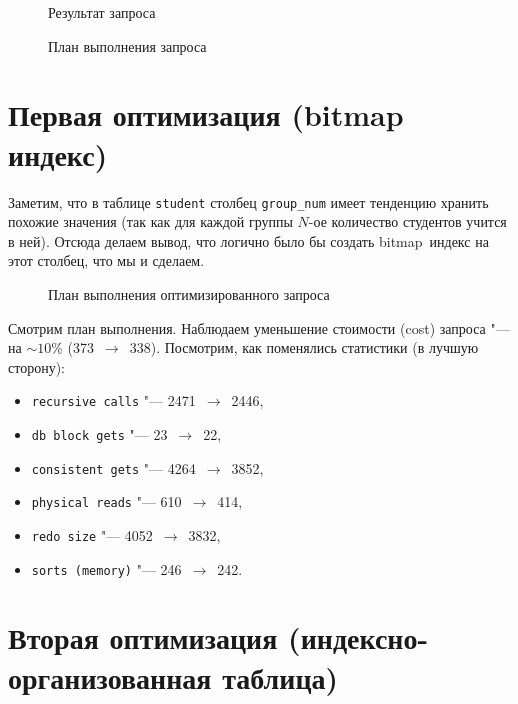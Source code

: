 \begin{figure}[H]%
  \caption{Результат запроса}
  \label{fig-task-3-output}
\end{figure}


\begin{figure}[H]%
  \caption{План выполнения запроса}
  \label{fig-task-3-plan}
\end{figure}


\section{Первая оптимизация (bitmap индекс)}


Заметим, что в таблице \texttt{student} столбец \texttt{group\_num} имеет тенденцию хранить похожие значения (так как для каждой группы $N$-ое количество студентов учится в ней).
Отсюда делаем вывод, что логично было бы создать bitmap~индекс на этот столбец, что мы и сделаем.

\begin{figure}[H]%
  \caption{План выполнения оптимизированного запроса}
  \label{fig-task-3-bitmap-plan}
\end{figure}

Смотрим план выполнения. Наблюдаем уменьшение стоимости (cost) запроса "--- на $\sim 10$\% (373~$\to$~338).
Посмотрим, как поменялись статистики (в лучшую сторону):
\begin{itemize}%
  \item \texttt{recursive calls} "--- 2471~$\to$~2446,
  \item \texttt{db block gets} "--- 23~$\to$~22,
  \item \texttt{consistent gets} "--- 4264~$\to$~3852,
  \item \texttt{physical reads} "--- 610~$\to$~414,
  \item \texttt{redo size} "--- 4052~$\to$~3832,
  \item \texttt{sorts (memory)} "--- 246~$\to$~242.
\end{itemize}


\section{Вторая оптимизация (индексно-организованная таблица)}


